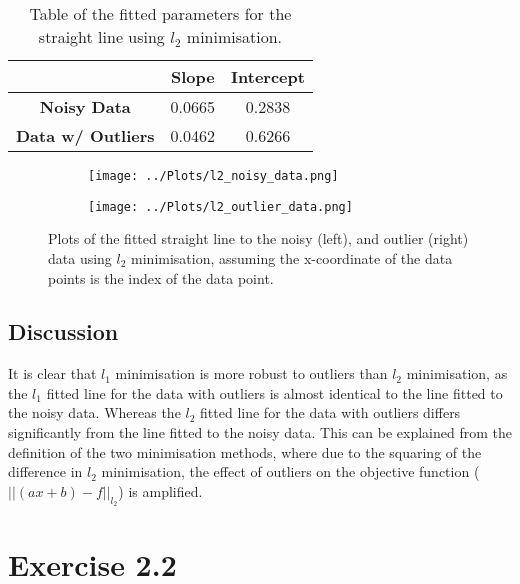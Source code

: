 \documentclass[12pt]{report} %
\begin{document}
\begin{table}
    \begin{center}
        \begin{tabular}{ccc}
            \hline
            & \textbf{Slope} & \textbf{Intercept} \\
            \hline
            \textbf{Noisy Data} & 0.0665 & 0.2838 \\
            \textbf{Data w/ Outliers} & 0.0462 & 0.6266 \\
            \hline
        \end{tabular}
        \caption{Table of the fitted parameters for the straight line using $l_{2}$ minimisation.}
        \label{tab:l2_fits}
    \end{center}
\end{table}

\begin{figure}[htbp]
    \centering
    \begin{subfigure}[b]{0.45\textwidth}
        \texttt{[image: ../Plots/l2\_noisy\_data.png]}
    \end{subfigure}
    \hfill
    \begin{subfigure}[b]{0.45\textwidth}
        \texttt{[image: ../Plots/l2\_outlier\_data.png]}
    \end{subfigure}
    \caption{Plots of the fitted straight line to the noisy (left), and outlier (right) data using $l_{2}$ minimisation, assuming the x-coordinate of the data points is the index of the data point.}
    \label{fig:l2_fits}
\end{figure}

\subsection{Discussion}

It is clear that $l_{1}$ minimisation is more robust to outliers than $l_{2}$ minimisation, as the $l_{1}$ fitted line for the data with outliers is almost identical to the line fitted to the noisy data. Whereas the $l_{2}$ fitted line for the data with outliers differs significantly from the line fitted to the noisy data. This can be explained from the definition of the two minimisation methods, where due to the squaring of the difference in $l_{2}$ minimisation, the effect of outliers on the objective function ($||(ax + b) - f||_{l_{2}}$) is amplified.

\section{Exercise 2.2}
\end{document}
